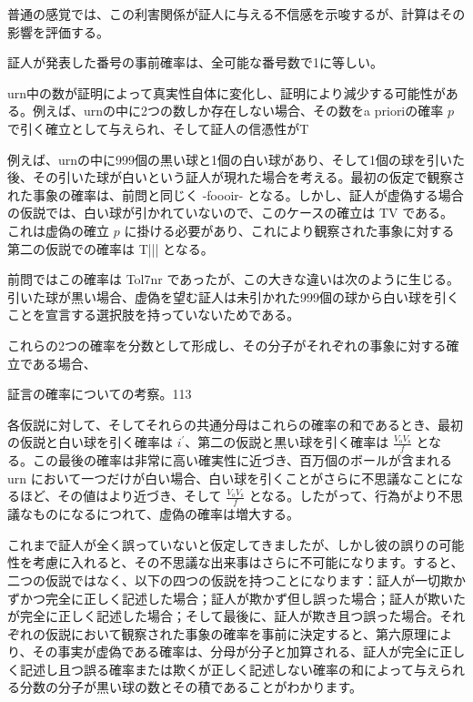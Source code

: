 \documentclass[a4paper,11pt,openany]{ltjsbook}
\begin{document}
普通の感覚では、この利害関係が証人に与える不信感を示唆するが、計算はその影響を評価する。

証人が発表した番号の事前確率は、全可能な番号数で1に等しい。

urn中の数が証明によって真実性自体に変化し、証明により減少する可能性がある。例えば、urnの中に2つの数しか存在しない場合、その数をa prioriの確率 $p$で引く確立として与えられ、そして証人の信憑性がT%

例えば、urnの中に999個の黒い球と1個の白い球があり、そして1個の球を引いた後、その引いた球が白いという証人が現れた場合を考える。最初の仮定で観察された事象の確率は、前問と同じく -foooir- となる。しかし、証人が虚偽する場合の仮説では、白い球が引かれていないので、このケースの確立は TV である。これは虚偽の確立 $p$ に掛ける必要があり、これにより観察された事象に対する第二の仮説での確率は T||| となる。

前問ではこの確率は Tol7nr であったが、この大きな違いは次のように生じる。引いた球が黒い場合、虚偽を望む証人は未引かれた999個の球から白い球を引くことを宣言する選択肢を持っていないためである。

これらの2つの確率を分数として形成し、その分子がそれぞれの事象に対する確立である場合、

証言の確率についての考察。113

各仮説に対して、そしてそれらの共通分母はこれらの確率の和であるとき、最初の仮説と白い球を引く確率は \(i^{\prime}\)、第二の仮説と黒い球を引く確率は \(\frac{V_{\text{o}} V_{\text{s}}}{f}\) となる。この最後の確率は非常に高い確実性に近づき、百万個のボールが含まれる urn において一つだけが白い場合、白い球を引くことがさらに不思議なことになるほど、その値はより近づき、そして \(\frac{V_{\text{o}} V_{\text{s}}}{f}\) となる。したがって、行為がより不思議なものになるにつれて、虚偽の確率は増大する。

これまで証人が全く誤っていないと仮定してきましたが、しかし彼の誤りの可能性を考慮に入れると、その不思議な出来事はさらに不可能になります。すると、二つの仮説ではなく、以下の四つの仮説を持つことになります：証人が一切欺かずかつ完全に正しく記述した場合；証人が欺かず但し誤った場合；証人が欺いたが完全に正しく記述した場合；そして最後に、証人が欺き且つ誤った場合。それぞれの仮説において観察された事象の確率を事前に決定すると、第六原理により、その事実が虚偽である確率は、分母が分子と加算される、証人が完全に正しく記述し且つ誤る確率または欺くが正しく記述しない確率の和によって与えられる分数の分子が黒い球の数とその積であることがわかります。
\end{document}
